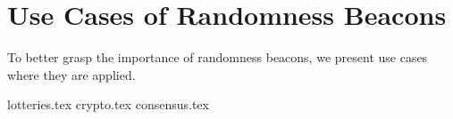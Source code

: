\section{Use Cases of Randomness Beacons}\label{sec:use_cases_of_randomness_beacons}
To better grasp the importance of randomness beacons, we present use cases where they are applied.

{lotteries.tex}
{crypto.tex}
{consensus.tex}
